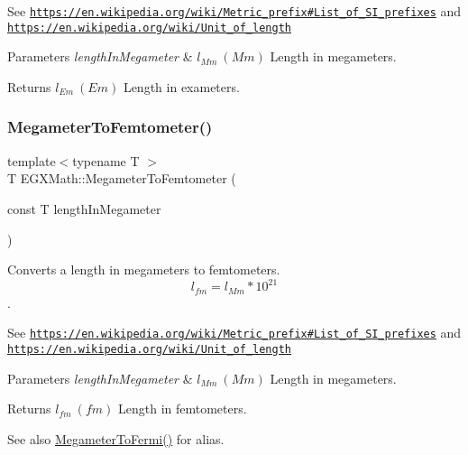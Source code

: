 See \href{https://en.wikipedia.org/wiki/Metric_prefix#List_of_SI_prefixes}{\tt https\+://en.\+wikipedia.\+org/wiki/\+Metric\+\_\+prefix\#\+List\+\_\+of\+\_\+\+S\+I\+\_\+prefixes} and \href{https://en.wikipedia.org/wiki/Unit_of_length}{\tt https\+://en.\+wikipedia.\+org/wiki/\+Unit\+\_\+of\+\_\+length} 
\begin{DoxyParams}{Parameters}
{\em length\+In\+Megameter} & $ l_{Mm}\ (Mm)$ Length in megameters. \\
\hline
\end{DoxyParams}
\begin{DoxyReturn}{Returns}
$ l_{Em}\ (Em)$ Length in exameters. 
\end{DoxyReturn}
\mbox{\label{group___e_g_x_math-_conversions-_length_conversions-_megameter-_s_i_gad53a3da18100c2bb2d12ecb9178ae597}} 
\subsubsection{\texorpdfstring{Megameter\+To\+Femtometer()}{MegameterToFemtometer()}}
{\footnotesize\ttfamily template$<$typename T $>$ \\
T E\+G\+X\+Math\+::\+Megameter\+To\+Femtometer (\begin{DoxyParamCaption}\item[{const T}]{length\+In\+Megameter }\end{DoxyParamCaption})}



Converts a length in megameters to femtometers. \[ l_{fm}=l_{Mm} * 10^{21} \]. 

See \href{https://en.wikipedia.org/wiki/Metric_prefix#List_of_SI_prefixes}{\tt https\+://en.\+wikipedia.\+org/wiki/\+Metric\+\_\+prefix\#\+List\+\_\+of\+\_\+\+S\+I\+\_\+prefixes} and \href{https://en.wikipedia.org/wiki/Unit_of_length}{\tt https\+://en.\+wikipedia.\+org/wiki/\+Unit\+\_\+of\+\_\+length} 
\begin{DoxyParams}{Parameters}
{\em length\+In\+Megameter} & $ l_{Mm}\ (Mm)$ Length in megameters. \\
\hline
\end{DoxyParams}
\begin{DoxyReturn}{Returns}
$ l_{fm}\ (fm)$ Length in femtometers. 
\end{DoxyReturn}
\begin{DoxySeeAlso}{See also}
\mbox{\hyperlink{group___e_g_x_math-_conversions-_length_conversions-_megameter-_non-_s_i_ga74f07a7c24ffe784415fb3d33a3b5bec}{Megameter\+To\+Fermi()}} for alias. 
\end{DoxySeeAlso}
\mbox{\label{group___e_g_x_math-_conversions-_length_conversions-_megameter-_s_i_gaa59e3194a054aeb6623886f72e245103}} 
